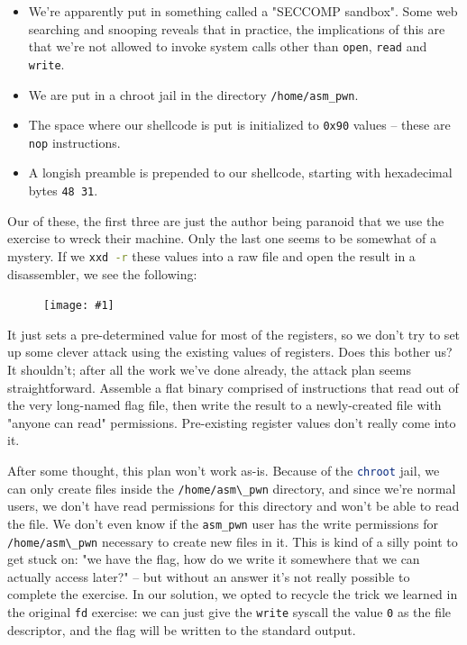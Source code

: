 \documentclass{article}
\newcommand{\displayimage}[1] {
\begin{figure}[H]
    \centering
    \texttt{[image: \#1]} 
\end{figure}
}
\newcommand{\xcode}[2]{\colorbox{ubuntuback}{\lstinline[language=#1]|#2|}}
\newcommand{\asm}[1]{\xcode{{[x86masm]assembler}}{#1}}
\newcommand{\code}[1]{\colorbox{ubuntuback}{\texttt{#1}}}
\begin{document}
\begin{itemize}
    \item We're apparently put in something called a "SECCOMP sandbox". Some web searching and snooping reveals that in practice, the implications of this are that we're not allowed to invoke system calls other than \code{open}, \code{read} and \code{write}.
    \item We are put in a chroot jail in the directory \xcode{bash}{/home/asm_pwn}.
    \item The space where our shellcode is put is initialized to \code{0x90} values -- these are \asm{nop} instructions. 
    \item A longish preamble is prepended to our shellcode, starting with hexadecimal bytes \code{48 31}.
\end{itemize}

Our of these, the first three are just the author being paranoid that we use the exercise to wreck their machine. Only the last one seems to be somewhat of a mystery. If we \xcode{bash}{xxd -r} these values into a raw file and open the result in a disassembler, we see the following:

\displayimage{./exercises/17_asm/stub.png}

It just sets a pre-determined value for most of the registers, so we don't try to set up some clever attack using the existing values of registers. Does this bother us? It shouldn't; after all the work we've done already, the attack plan seems straightforward. Assemble a flat binary comprised of instructions that read out of the very long-named flag file, then write the result to a newly-created file with "anyone can read" permissions. Pre-existing register values don't really come into it.

After some thought, this plan won't work as-is. Because of the \xcode{bash}{chroot} jail, we can only create files inside the \xcode{bash}{/home/asm\_pwn} directory, and since we're normal users, we don't have read permissions for this directory and won't be able to read the file. We don't even know if the \code{asm\_pwn} user has the write permissions for \xcode{bash}{/home/asm\_pwn} necessary to create new files in it. This is kind of a silly point to get stuck on: "we have the flag, how do we write it somewhere that we can actually access later?" -- but without an answer it's not really possible to complete the exercise. In our solution, we opted to recycle the trick we learned in the original \code{fd} exercise: we can just give the \code{write} syscall the value \code{0} as the file descriptor, and the flag will be written to the standard output.
\end{document}
